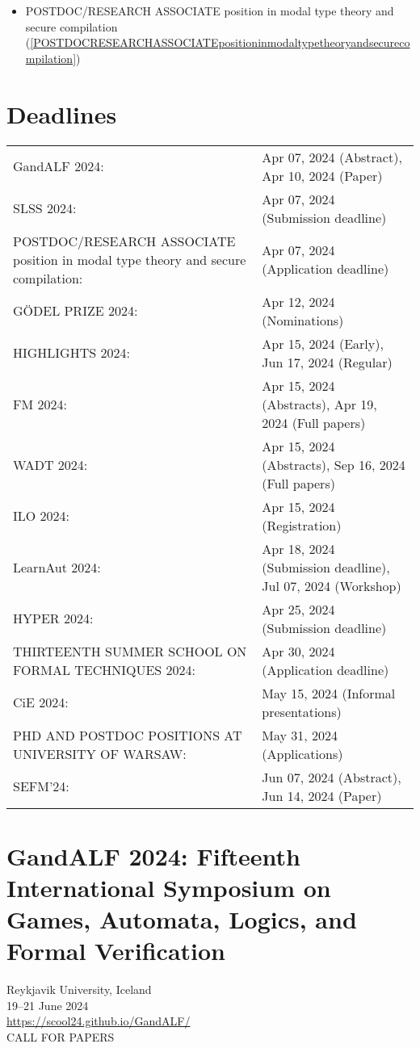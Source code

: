 \documentclass[prodmode,acmtecs]{acmsmall} %
\begin{document}
\begin{itemize}
\begin{itemize}\item POSTDOC/RESEARCH ASSOCIATE position in modal type theory and secure compilation (\cref{POSTDOCRESEARCHASSOCIATEpositioninmodaltypetheoryandsecurecompilation})
\end{itemize} 
\end{itemize}\section{Deadlines}\label{deadlines}\begin{tabulary}{\linewidth}{LL}GandALF 2024:  & Apr 07, 2024 (Abstract), Apr 10, 2024 (Paper) \\
SLSS 2024:  & Apr 07, 2024 (Submission deadline) \\
POSTDOC/RESEARCH ASSOCIATE position in modal type theory and secure compilation:  & Apr 07, 2024 (Application deadline) \\
GÖDEL PRIZE 2024:  & Apr 12, 2024  (Nominations) \\
HIGHLIGHTS 2024:  & Apr 15, 2024 (Early), Jun 17, 2024 (Regular) \\
FM 2024:  & Apr 15, 2024 (Abstracts), Apr 19, 2024 (Full papers) \\
WADT 2024:  & Apr 15, 2024 (Abstracts), Sep 16, 2024 (Full papers) \\
ILO 2024:  & Apr 15, 2024 (Registration) \\
LearnAut 2024:  & Apr 18, 2024 (Submission deadline), Jul 07, 2024 (Workshop) \\
HYPER 2024:  & Apr 25, 2024 (Submission deadline) \\
THIRTEENTH SUMMER SCHOOL ON FORMAL TECHNIQUES 2024:  & Apr 30, 2024 (Application deadline) \\
CiE 2024:  & May 15, 2024 (Informal presentations) \\
PHD AND POSTDOC POSITIONS AT UNIVERSITY OF WARSAW:  & May 31, 2024 (Applications) \\
SEFM'24:  & Jun 07, 2024 (Abstract), Jun 14, 2024 (Paper) \\
\end{tabulary}
\section{GandALF 2024: Fifteenth International Symposium on Games, Automata, Logics, and Formal Verification}\label{GandALF2024}  Reykjavik University, Iceland\\ 
  19–21 June 2024 \\ 
  \href{https://scool24.github.io/GandALF/}{https://scool24.github.io/GandALF/}\\ 
CALL FOR PAPERS 
\end{document}
